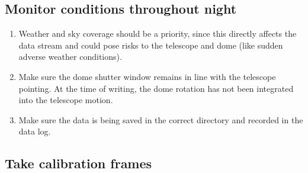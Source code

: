 \documentclass{article}
\begin{document}
	\subsection{Monitor conditions throughout night}

		\begin{enumerate}

			\item Weather and sky coverage should be a priority, since this directly affects the data stream and could pose risks to the telescope and dome (like sudden adverse weather conditions).

			\item Make sure the dome shutter window remains in line with the telescope pointing. At the time of writing, the dome rotation has not been integrated into the telescope motion.

			\item Make sure the data is being saved in the correct directory and recorded in the data log.

		\end{enumerate}

	\subsection{Take calibration frames}
\end{document}
